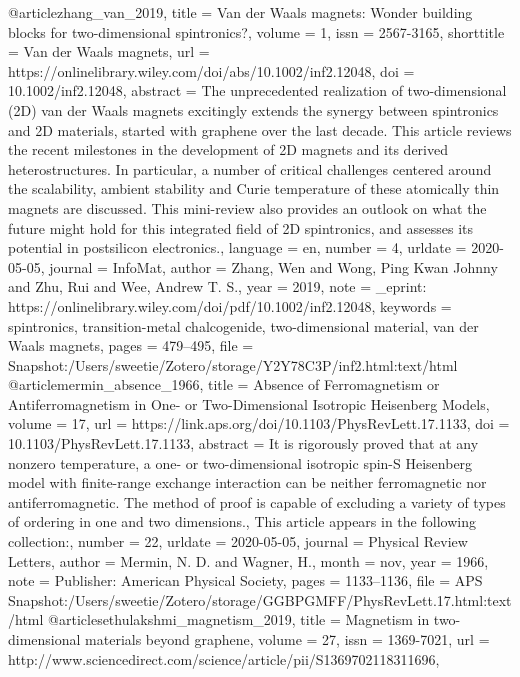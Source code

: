 {@article{zhang_van_2019,
	title = {Van der {Waals} magnets: {Wonder} building blocks for two-dimensional spintronics?},
	volume = {1},
	issn = {2567-3165},
	shorttitle = {Van der {Waals} magnets},
	url = {https://onlinelibrary.wiley.com/doi/abs/10.1002/inf2.12048},
	doi = {10.1002/inf2.12048},
	abstract = {The unprecedented realization of two-dimensional (2D) van der Waals magnets excitingly extends the synergy between spintronics and 2D materials, started with graphene over the last decade. This article reviews the recent milestones in the development of 2D magnets and its derived heterostructures. In particular, a number of critical challenges centered around the scalability, ambient stability and Curie temperature of these atomically thin magnets are discussed. This mini-review also provides an outlook on what the future might hold for this integrated field of 2D spintronics, and assesses its potential in postsilicon electronics.},
	language = {en},
	number = {4},
	urldate = {2020-05-05},
	journal = {InfoMat},
	author = {Zhang, Wen and Wong, Ping Kwan Johnny and Zhu, Rui and Wee, Andrew T. S.},
	year = {2019},
	note = {\_eprint: https://onlinelibrary.wiley.com/doi/pdf/10.1002/inf2.12048},
	keywords = {spintronics, transition-metal chalcogenide, two-dimensional material, van der Waals magnets},
	pages = {479--495},
	file = {Snapshot:/Users/sweetie/Zotero/storage/Y2Y78C3P/inf2.html:text/html}
}
@article{mermin_absence_1966,
	title = {Absence of {Ferromagnetism} or {Antiferromagnetism} in {One}- or {Two}-{Dimensional} {Isotropic} {Heisenberg} {Models}},
	volume = {17},
	url = {https://link.aps.org/doi/10.1103/PhysRevLett.17.1133},
	doi = {10.1103/PhysRevLett.17.1133},
	abstract = {It is rigorously proved that at any nonzero temperature, a one- or two-dimensional isotropic spin-S Heisenberg model with finite-range exchange interaction can be neither ferromagnetic nor antiferromagnetic. The method of proof is capable of excluding a variety of types of ordering in one and two dimensions., This article appears in the following collection:},
	number = {22},
	urldate = {2020-05-05},
	journal = {Physical Review Letters},
	author = {Mermin, N. D. and Wagner, H.},
	month = nov,
	year = {1966},
	note = {Publisher: American Physical Society},
	pages = {1133--1136},
	file = {APS Snapshot:/Users/sweetie/Zotero/storage/GGBPGMFF/PhysRevLett.17.html:text/html}
}
@article{sethulakshmi_magnetism_2019,
	title = {Magnetism in two-dimensional materials beyond graphene},
	volume = {27},
	issn = {1369-7021},
	url = {http://www.sciencedirect.com/science/article/pii/S1369702118311696},
}}
